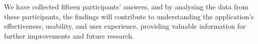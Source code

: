 We have collected fifteen participants' answers, and by analysing the data from
these participants, the findings will contribute to understanding the
application's effectiveness, usability, and user experience, providing valuable
information for further improvements and future research.
